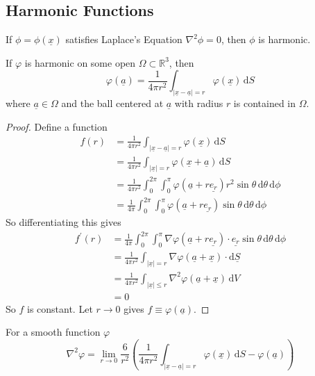 \subsection{Harmonic Functions}
If $\phi=\phi(\underline{x})$ satisfies Laplace's Equation $\nabla^2\phi=0$, then $\phi$ is harmonic.
\begin{proposition}
    If $\varphi$ is harmonic on some open $\Omega\subset\mathbb R^3$, then
    $$\varphi(\underline{a})=\frac{1}{4\pi r^2}\int_{|\underline{x}-\underline{a}|=r}\varphi(\underline{x})\,\mathrm dS$$
    where $\underline{a}\in\Omega$ and the ball centered at $\underline{a}$ with radius $r$ is contained in $\Omega$.
\end{proposition}
\begin{proof}
    Define a function
    \begin{align*}
        f(r)&=\frac{1}{4\pi r^2}\int_{|\underline{x}-\underline{a}|=r}\varphi(\underline{x})\,\mathrm dS\\
        &=\frac{1}{4\pi r^2}\int_{|\underline{x}|=r}\varphi(\underline{x}+\underline{a})\,\mathrm dS\\
        &=\frac{1}{4\pi r^2}\int_0^{2\pi}\int_0^\pi \varphi(\underline{a}+r\underline{e_r})r^2\sin\theta\,\mathrm d\theta\,\mathrm d\phi\\
        &=\frac{1}{4\pi}\int_0^{2\pi}\int_0^\pi \varphi(\underline{a}+r\underline{e_r})\sin\theta\,\mathrm d\theta\,\mathrm d\phi
    \end{align*}
    So differentiating this gives
    \begin{align*}
        f^\prime(r)&=\frac{1}{4\pi}\int_0^{2\pi}\int_0^\pi \nabla\varphi(\underline{a}+r\underline{e_r})\cdot\underline{e_r}\sin\theta\,\mathrm d\theta\,\mathrm d\phi\\
        &=\frac{1}{4\pi r^2}\int_{|\underline{x}|=r}\nabla\varphi(\underline{a}+\underline{x})\cdot\mathrm d\underline{S}\\
        &=\frac{1}{4\pi r^2}\int_{|\underline{x}|\le r}\nabla^2\varphi(\underline{a}+\underline{x})\,\mathrm dV\\
        &=0
    \end{align*}
    So $f$ is constant.
    Let $r\to 0$ gives $f\equiv \varphi(\underline{a})$.
\end{proof}
\begin{proposition}
    For a smooth function $\varphi$
    $$\nabla^2\varphi=\lim_{r\to 0}\frac{6}{r^2}\left(\frac{1}{4\pi r^2}\int_{|\underline{x}-\underline{a}|=r}\varphi(\underline{x})\,\mathrm dS-\varphi(\underline{a})\right)$$
\end{proposition}
